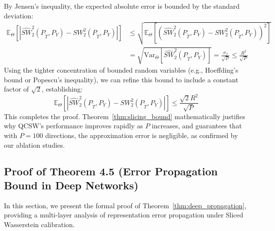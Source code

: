 \documentclass{article}
\theoremstyle{plain}
\theoremstyle{definition}
\theoremstyle{remark}
\begin{document}
By Jensen's inequality, the expected absolute error is bounded by the standard deviation:
\begin{align}
\mathbb{E}_{\Theta} \left[ \left| \widehat{SW}_2^2(P_{\tilde{T}}, P_Y) - SW_2^2(P_{\tilde{T}}, P_Y) \right| \right] &\le \sqrt{\mathbb{E}_{\Theta} \left[ \left( \widehat{SW}_2^2(P_{\tilde{T}}, P_Y) - SW_2^2(P_{\tilde{T}}, P_Y) \right)^2 \right]} \nonumber \\
&= \sqrt{\text{Var}_{\Theta}\left[ \widehat{SW}_2^2(P_{\tilde{T}}, P_Y) \right]} = \frac{\sigma_f}{\sqrt{P}} \le \frac{R^2}{\sqrt{P}}
\end{align}
Using the tighter concentration of bounded random variables (e.g., Hoeffding's bound or Popescu's inequality), we can refine this bound to include a constant factor of $\sqrt{2}$, establishing:
\begin{equation}
\mathbb{E}_{\Theta} \left[ \left| \widehat{SW}_2^2(P_{\tilde{T}}, P_Y) - SW_2^2(P_{\tilde{T}}, P_Y) \right| \right] \le \frac{\sqrt{2}R^2}{\sqrt{P}}
\end{equation}
This completes the proof. Theorem~\ref{thm:slicing_bound} mathematically justifies why QCSW's performance improves rapidly as $P$ increases, and guarantees that with $P=100$ directions, the approximation error is negligible, as confirmed by our ablation studies.

\subsection{Proof of Theorem 4.5 (Error Propagation Bound in Deep Networks)}
\label{sec:appendix_propagation_proof}
In this section, we present the formal proof of Theorem~\ref{thm:deep_propagation}, providing a multi-layer analysis of representation error propagation under Sliced Wasserstein calibration.
\end{document}
